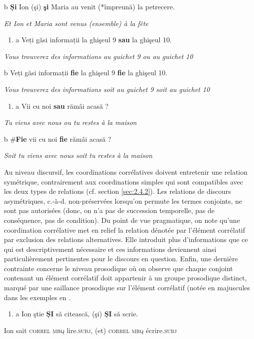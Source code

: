   b  \textbf{Și} Ion (şi) \textbf{şi} Maria au venit (*împreună) la petrecere.

{\itshape
Et Ion et Maria sont venus (ensemble) à la fête}


\begin{enumerate}
\item \label{bkm:Ref301510943}a  Veți găsi informații la ghişeul 9 \textbf{sau} la ghişeul 10.


\end{enumerate}
{\itshape
Vous trouverez des informations au guichet 9 ou au guichet 10}

  b  Veți găsi informații \textbf{fie} la ghişeul 9 \textbf{fie} la ghişeul 10.

{\itshape
Vous trouverez des informations soit au guichet 9 soit au guichet 10}


\begin{enumerate}
\item \label{bkm:Ref301533034}a  Vii cu noi \textbf{sau} rămâi acasă ?


\end{enumerate}
{\itshape
Tu viens avec nous ou tu restes à la maison}

  b  \#\textbf{Fie} vii cu noi \textbf{fie} rămâi acasă ?

{\itshape
Soit tu viens avec nous soit tu restes à la maison}

Au niveau discursif, les coordinations corrélatives doivent entretenir une relation symétrique, contrairement aux coordinations simples qui sont compatibles avec les deux types de relations (cf. section \ref{sec:2.4.2}). Les relations de discours asymétriques, c.-à-d. non-préservées lorsqu'on permute les termes conjoints, ne sont pas autorisées (donc, on n'a pas de succession temporelle, pas de conséquence, pas de condition). Du point de vue pragmatique, on note qu'une coordination corrélative met en relief la relation dénotée par l'élément corrélatif par exclusion des relations alternatives. Elle introduit plus d'informations que ce qui est descriptivement nécessaire et ces informations deviennent ainsi particulièrement pertinentes pour le discours en question. Enfin, une dernière contrainte concerne le niveau prosodique où on observe que chaque conjoint contenant un élément corrélatif doit appartenir à un groupe prosodique distinct, marqué par une saillance prosodique sur l'élément corrélatif (notée en majuscules dans les exemples en .


\begin{enumerate}
\item \label{bkm:Ref301510387}a  Ion  ştie  \textbf{ȘI}  să  citească,  (şi)  \textbf{ȘI}  să  scrie.


\end{enumerate}
Ion  sait  \textsc{correl  mrq  } lire.\textsc{subj},  (et)  \textsc{correl  mrq}  écrire.\textsc{subj} 

